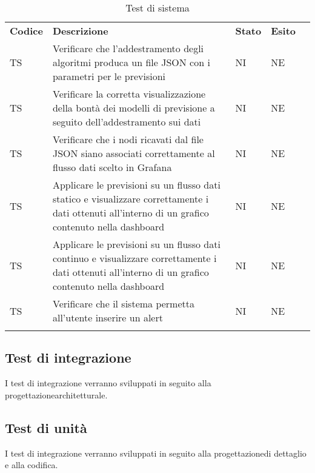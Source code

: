 \begin{longtable} {
		>{}p{15mm} 
		>{}p{79.5mm}
		>{}p{15mm} 
		>{}p{15mm}
		>{}p{0mm}}
	\rowcolor{gray!50}
	\textbf{Codice} & \textbf{Descrizione} & \textbf{Stato} & \textbf{Esito} &\TBstrut \\
	TS & Verificare che l'addestramento degli algoritmi produca un file JSON con i parametri per le previsioni & NI & NE  &\TBstrut \\ [2mm]
	TS & Verificare la corretta visualizzazione della bontà dei modelli di previsione a seguito dell'addestramento sui dati & NI & NE  &\TBstrut \\ [2mm]
	TS & Verificare che i nodi ricavati dal file JSON siano associati correttamente al flusso dati scelto in Grafana\glo & NI & NE  &\TBstrut \\ [2mm]
	TS & Applicare le previsioni su un flusso dati statico e visualizzare correttamente i dati ottenuti all'interno di un grafico contenuto nella dashboard\glo & NI & NE  &\TBstrut \\ [2mm]
	TS & Applicare le previsioni su un flusso dati continuo e visualizzare correttamente i dati ottenuti all'interno di un grafico contenuto nella dashboard\glo & NI & NE  &\TBstrut \\ [2mm]
	TS & Verificare che il sistema permetta all'utente inserire un alert\glo & NI & NE  &\TBstrut \\ [2mm]
	\rowcolor{white}
	\caption{Test di sistema}
\end{longtable}


\subsection{Test di integrazione}
I test di integrazione verranno sviluppati in seguito alla progettazione\glosp architetturale.

\subsection{Test di unità}
I test di integrazione verranno sviluppati in seguito alla progettazione\glosp di dettaglio e alla codifica.
